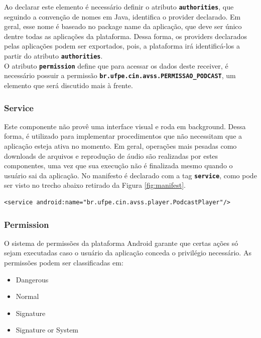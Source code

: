 \documentclass[a4paper,12pt]{article}
\begin{document}
Ao declarar este elemento é necessário definir o atributo {\small\texttt{\textbf{authorities}}}, que seguindo a convenção de nomes em Java, identifica o provider declarado. Em geral, esse nome é baseado no package name da aplicação, que deve ser único dentre todas as aplicações da plataforma. Dessa forma, os providers declarados pelas aplicações podem ser exportados, pois, a plataforma irá identificá-los a partir do atributo {\small\texttt{\textbf{authorities}}}.\\

O atributo {\small\texttt{\textbf{permission}}} define que para acessar os dados deste receiver, é necessário possuir a permissão {\small\texttt{\textbf{br.ufpe.cin.avss.PERMISSAO\_PODCAST}}}, um elemento que será discutido mais à frente.




\subsubsection{Service}



Este componente não provê uma interface visual e roda em background. Dessa forma, é utilizado para implementar procedimentos  que não necessitam que a aplicação esteja ativa no momento. Em geral, operações mais pesadas como downloads de arquivos e reprodução de áudio são realizadas por estes componentes, uma vez que sua execução não é finalizada mesmo quando o usuário sai da aplicação. No manifesto é declarado com a tag {\small\texttt{\textbf{service}}}, como pode ser visto no trecho abaixo retirado da Figura \ref{fig:manifest}.
{\fontsize{9pt}{12pt}
\begin{verbatim}
<service android:name="br.ufpe.cin.avss.player.PodcastPlayer"/>
\end{verbatim}
}

\subsubsection{Permission}
O sistema de permissões da plataforma Android garante que certas ações só sejam executadas caso o usuário da aplicação conceda o privilégio necessário. As permissões podem ser classificadas em:
\begin{itemize}
    \item {Dangerous}
    \item {Normal}
    \item {Signature}
    \item {Signature or System}
\end{itemize}
\end{document}
